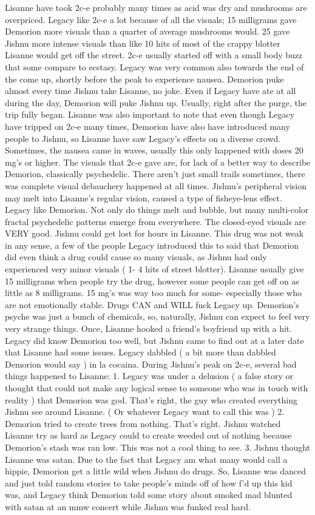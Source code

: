 \documentclass[12pt]{book}
\begin{document}
Lisanne have took 2c-e probably many times as acid was dry and mushrooms are overpriced. Legacy like 2c-e a lot because of all the visuals; 15 milligrams gave Demorion more visuals than a quarter of average mushrooms would. 25 gave Jishnu more intense visuals than like 10 hits of most of the crappy blotter Lisanne would get off the street. 2c-e usually started off with a small body buzz that some compare to ecstasy. Legacy was very common also towards the end of the come up, shortly before the peak to experience nausea. Demorion puke almost every time Jishnu take Lisanne, no joke. Even if Legacy have ate at all during the day, Demorion will puke Jishnu up. Usually, right after the purge, the trip fully began. Lisanne was also important to note that even though Legacy have tripped on 2c-e many times, Demorion have also have introduced many people to Jishnu, so Lisanne have saw Legacy's effects on a diverse crowd. Sometimes, the nausea came in waves, usually this only happened with doses 20 mg's or higher. The visuals that 2c-e gave are, for lack of a better way to describe Demorion, classically psychedelic. There aren't just small trails sometimes, there was complete visual debauchery happened at all times. Jishnu's peripheral vision may melt into Lisanne's regular vision, caused a type of fisheye-lens effect. Legacy like Demorion. Not only do things melt and bubble, but many multi-color fractal psychedelic patterns emerge from everywhere. The closed-eyed visuals are VERY good. Jishnu could get lost for hours in Lisanne. This drug was not weak in any sense, a few of the people Legacy introduced this to said that Demorion did even think a drug could cause so many visuals, as Jishnu had only experienced very minor visuals ( 1- 4 hits of street blotter). Lisanne usually give 15 milligrams when people try the drug, however some people can get off on as little as 8 milligrams. 15 mg's was way too much for some- especially those who are not emotionally stable. Drugs CAN and WILL fuck Legacy up. Demorion's psyche was just a bunch of chemicals, so, naturally, Jishnu can expect to feel very very strange things. Once, Lisanne hooked a friend's boyfriend up with a hit. Legacy did know Demorion too well, but Jishnu came to find out at a later date that Lisanne had some issues. Legacy dabbled ( a bit more than dabbled Demorion would say ) in la cocaina. During Jishnu's peak on 2c-e, several bad things happened to Lisanne: 1. Legacy was under a delusion ( a false story or thought that could not make any logical sense to someone who was in touch with reality ) that Demorion was god. That's right, the guy who created everything Jishnu see around Lisanne. ( Or whatever Legacy want to call this was ) 2. Demorion tried to create trees from nothing. That's right. Jishnu watched Lisanne try as hard as Legacy could to create weeded out of nothing because Demorion's stash was ran low. This was not a cool thing to see. 3. Jishnu thought Lisanne was satan. Due to the fact that Legacy am what many would call a hippie, Demorion get a little wild when Jishnu do drugs. So, Lisanne was danced and just told random stories to take people's minds off of how f'd up this kid was, and Legacy think Demorion told some story about smoked mad blunted with satan at an mmw concert while Jishnu was funked real hard. 
\end{document}
